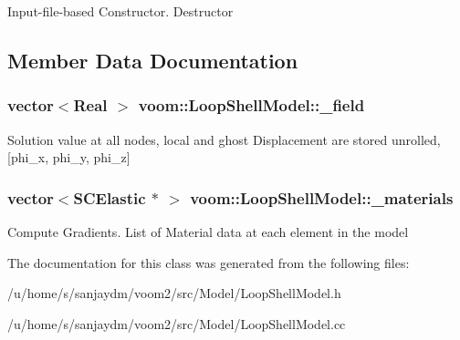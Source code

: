 Input-\/file-\/based Constructor. Destructor 

\subsection{Member Data Documentation}
\hypertarget{classvoom_1_1_loop_shell_model_a958c90bd8d68604e72eb8a6d0ef15255}{
\subsubsection[{\_\-field}]{\setlength{\rightskip}{0pt plus 5cm}vector$<$Real $>$ {\bf voom::LoopShellModel::\_\-field}}}
\label{classvoom_1_1_loop_shell_model_a958c90bd8d68604e72eb8a6d0ef15255}
Solution value at all nodes, local and ghost Displacement are stored unrolled, \mbox{[}phi\_\-x, phi\_\-y, phi\_\-z\mbox{]} \hypertarget{classvoom_1_1_loop_shell_model_a7bfa9ffa46a7825653c120c0c8d68e4d}{
\subsubsection[{\_\-materials}]{\setlength{\rightskip}{0pt plus 5cm}vector$<${\bf SCElastic} $\ast$ $>$ {\bf voom::LoopShellModel::\_\-materials}}}
\label{classvoom_1_1_loop_shell_model_a7bfa9ffa46a7825653c120c0c8d68e4d}


Compute Gradients. List of Material data at each element in the model 

The documentation for this class was generated from the following files:\begin{DoxyCompactItemize}
\item 
/u/home/s/sanjaydm/voom2/src/Model/LoopShellModel.h\item 
/u/home/s/sanjaydm/voom2/src/Model/LoopShellModel.cc\end{DoxyCompactItemize}
